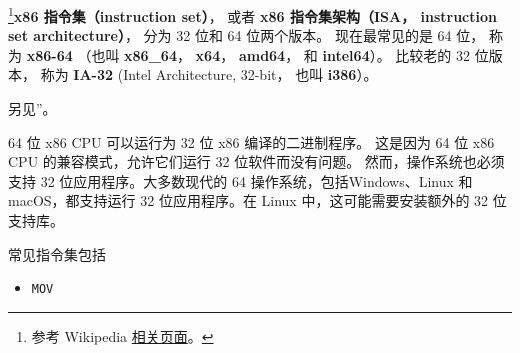 
\begin{issues}
\issueDraft
\end{issues}

\footnote{参考 Wikipedia \href{https://en.wikipedia.org/wiki/X86-64}{相关页面}。}\textbf{x86 指令集（instruction set）}， 或者 \textbf{x86 指令集架构（ISA， instruction set architecture）}， 分为 32 位和 64 位两个版本。 现在最常见的是 64 位， 称为 \textbf{x86-64} （也叫 \textbf{x86_64}， \textbf{x64}， \textbf{amd64}， 和 \textbf{intel64}）。 比较老的 32 位版本， 称为 \textbf{IA-32} (Intel Architecture, 32-bit， 也叫 \textbf{i386}）。

另见”。

64 位 x86 CPU 可以运行为 32 位 x86 编译的二进制程序。 这是因为 64 位 x86 CPU 的兼容模式，允许它们运行 32 位软件而没有问题。 然而，操作系统也必须支持 32 位应用程序。大多数现代的 64 操作系统，包括Windows、Linux 和 macOS，都支持运行 32 位应用程序。在 Linux 中，这可能需要安装额外的 32 位支持库。

常见指令集包括
\begin{itemize}
\item \verb`MOV`
\end{itemize}
